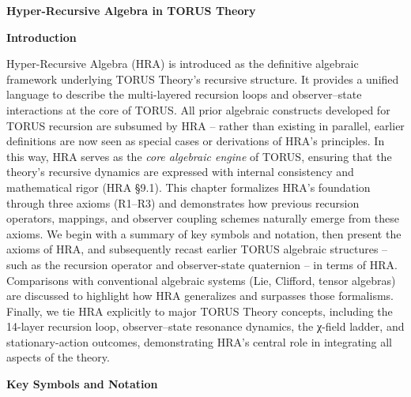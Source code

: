 \documentclass[]{article}
\date{}
\begin{document}
\textbf{Hyper-Recursive Algebra in TORUS Theory}

\textbf{Introduction}

Hyper-Recursive Algebra (HRA) is introduced as the definitive algebraic
framework underlying TORUS Theory's recursive structure. It provides a
unified language to describe the multi-layered recursion loops and
observer--state interactions at the core of TORUS. All prior algebraic
constructs developed for TORUS recursion are subsumed by HRA -- rather
than existing in parallel, earlier definitions are now seen as special
cases or derivations of HRA's principles. In this way, HRA serves as the
\emph{core algebraic engine} of TORUS, ensuring that the theory's
recursive dynamics are expressed with internal consistency and
mathematical rigor (HRA §9.1). This chapter formalizes HRA's foundation
through three axioms (R1--R3) and demonstrates how previous recursion
operators, mappings, and observer coupling schemes naturally emerge from
these axioms. We begin with a summary of key symbols and notation, then
present the axioms of HRA, and subsequently recast earlier TORUS
algebraic structures -- such as the recursion operator and
observer-state quaternion -- in terms of HRA. Comparisons with
conventional algebraic systems (Lie, Clifford, tensor algebras) are
discussed to highlight how HRA generalizes and surpasses those
formalisms. Finally, we tie HRA explicitly to major TORUS Theory
concepts, including the 14-layer recursion loop, observer--state
resonance dynamics, the χ-field ladder, and stationary-action outcomes,
demonstrating HRA's central role in integrating all aspects of the
theory.

\textbf{Key Symbols and Notation}
\end{document}
